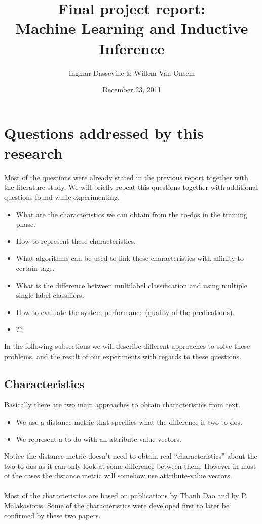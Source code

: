 \documentclass[a4paper,titlepage]{article}
\title{Final project report:\\Machine Learning and Inductive Inference}
\author{Ingmar Dasseville \& Willem Van Onsem}
\date{December 23, 2011}
\begin{document}
\begin{titlepage}
\maketitle
\end{titlepage}
\tableofcontents
\section{Questions addressed by this research}
Most of the questions were already stated in the previous report together with the literature study. We will briefly repeat this questions together with additional questions found while experimenting.
\begin{itemize}
 \item What are the characteristics we can obtain from the to-dos in the training phase.
 \item How to represent these characteristics.
 \item What algorithms can be used to link these characteristics with affinity to certain tags.
 \item What is the difference between multilabel classification and using multiple single label classifiers.
 \item How to evaluate the system performance (quality of the predications).
 \item ??
\end{itemize}
In the following subsections we will describe different approaches to solve these problems, and the result of our experiments with regards to these questions.
\subsection{Characteristics}
Basically there are two main approaches to obtain characteristics from text.
\begin{itemize}
 \item We use a distance metric that specifies what the difference is two to-dos.
 \item We represent a to-do with an attribute-value vectors.
\end{itemize}
Notice the distance metric doesn't need to obtain real ``characteristics'' about the two to-dos as it can only look at some difference between them. However in most of the cases the distance metric will somehow use attribute-value vectors.
\paragraph{}
Most of the characteristics are based on publications \cite{codeproject2,codeproject1} by Thanh Dao and \cite{Malakasiotis:2007:LTE:1654536.1654547} by P. Malakasiotis. Some of the characteristics were developed first to later be confirmed by these two papers.
\end{document}

